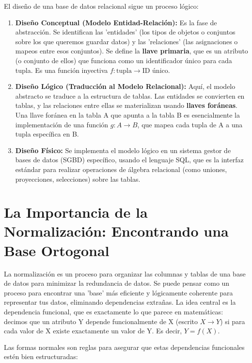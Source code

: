 \documentclass[12pt, letterpaper]{article}
\begin{document}
El diseño de una base de datos relacional sigue un proceso lógico:

\begin{enumerate}
    \item \textbf{Diseño Conceptual (Modelo Entidad-Relación):} Es la fase de abstracción. Se identifican las 'entidades' (los tipos de objetos o conjuntos sobre los que queremos guardar datos) y las 'relaciones' (las asignaciones o mapeos entre esos conjuntos). Se define la \textbf{llave primaria}, que es un atributo (o conjunto de ellos) que funciona como un identificador único para cada tupla. Es una función inyectiva $f: \text{tupla} \rightarrow \text{ID único}$.

    \item \textbf{Diseño Lógico (Traducción al Modelo Relacional):} Aquí, el modelo abstracto se traduce a la estructura de tablas. Las entidades se convierten en tablas, y las relaciones entre ellas se materializan usando \textbf{llaves foráneas}. Una llave foránea en la tabla A que apunta a la tabla B es esencialmente la implementación de una función $g: A \rightarrow B$, que mapea cada tupla de A a una tupla específica en B.

    \item \textbf{Diseño Físico:} Se implementa el modelo lógico en un sistema gestor de bases de datos (SGBD) específico, usando el lenguaje SQL, que es la interfaz estándar para realizar operaciones de álgebra relacional (como uniones, proyecciones, selecciones) sobre las tablas.
\end{enumerate}

\section*{La Importancia de la Normalización: Encontrando una Base Ortogonal}

La normalización es un proceso para organizar las columnas y tablas de una base de datos para minimizar la redundancia de datos. Se puede pensar como un proceso para encontrar una 'base' más eficiente y lógicamente coherente para representar tus datos, eliminando dependencias extrañas. La idea central es la dependencia funcional, que es exactamente lo que parece en matemáticas: decimos que un atributo Y depende funcionalmente de X (escrito $X \rightarrow Y$) si para cada valor de X existe exactamente un valor de Y. Es decir, $Y = f(X)$.

Las formas normales son reglas para asegurar que estas dependencias funcionales estén bien estructuradas:
\end{document}
